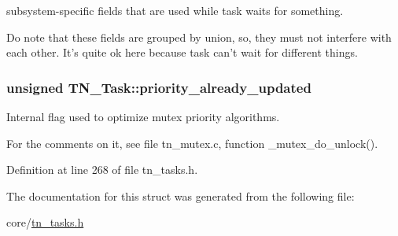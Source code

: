 subsystem-\/specific fields that are used while task waits for something. 

Do note that these fields are grouped by union, so, they must not interfere with each other. It's quite ok here because task can't wait for different things. \hypertarget{structTN__Task_abb4d22974c7317dd610f646b9048656d}{
\subsubsection[{priority\+\_\+already\+\_\+updated}]{\setlength{\rightskip}{0pt plus 5cm}unsigned T\+N\+\_\+\+Task\+::priority\+\_\+already\+\_\+updated}}\label{structTN__Task_abb4d22974c7317dd610f646b9048656d}


Internal flag used to optimize mutex priority algorithms. 

For the comments on it, see file tn\+\_\+mutex.\+c, function {\ttfamily \+\_\+mutex\+\_\+do\+\_\+unlock()}. 

Definition at line 268 of file tn\+\_\+tasks.\+h.



The documentation for this struct was generated from the following file\+:\begin{DoxyCompactItemize}
\item 
core/\hyperlink{tn__tasks_8h}{tn\+\_\+tasks.\+h}\end{DoxyCompactItemize}
